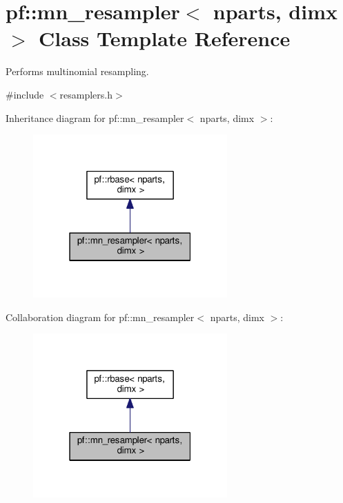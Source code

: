 \hypertarget{classpf_1_1mn__resampler}{}\section{pf\+:\+:mn\+\_\+resampler$<$ nparts, dimx $>$ Class Template Reference}
\label{classpf_1_1mn__resampler}


Performs multinomial resampling.  




{\ttfamily \#include $<$resamplers.\+h$>$}



Inheritance diagram for pf\+:\+:mn\+\_\+resampler$<$ nparts, dimx $>$\+:\nopagebreak
\begin{figure}[H]
\begin{center}
\leavevmode
\includegraphics[width=211pt]{classpf_1_1mn__resampler__inherit__graph}
\end{center}
\end{figure}


Collaboration diagram for pf\+:\+:mn\+\_\+resampler$<$ nparts, dimx $>$\+:\nopagebreak
\begin{figure}[H]
\begin{center}
\leavevmode
\includegraphics[width=211pt]{classpf_1_1mn__resampler__coll__graph}
\end{center}
\end{figure}
